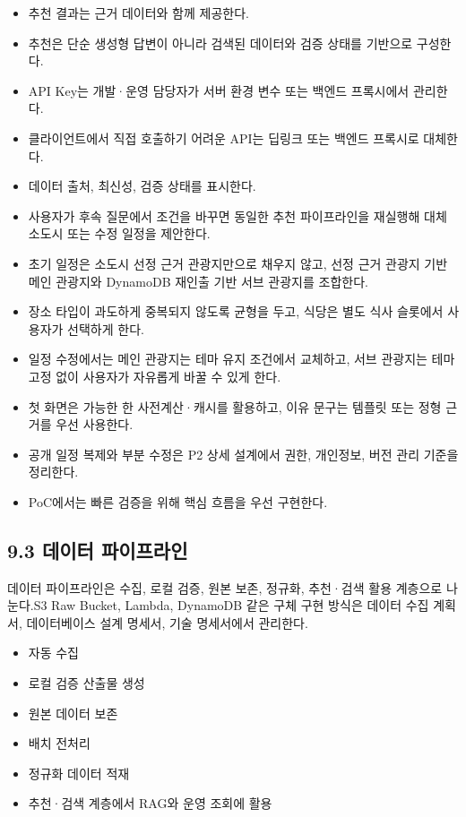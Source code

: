 \documentclass[12pt,a4paper]{article}
\newcommand{\DocNeedspace}[1]{\par\ifdim\dimexpr\pagegoal-\pagetotal\relax<#1\newpage\fi}
\begin{document}
\begin{itemize}
\item 추천 결과는 근거 데이터와 함께 제공한다.
\item 추천은 단순 생성형 답변이 아니라 검색된 데이터와 검증 상태를 기반으로 구성한다.
\item API Key는 개발·운영 담당자가 서버 환경 변수 또는 백엔드 프록시에서 관리한다.
\item 클라이언트에서 직접 호출하기 어려운 API는 딥링크 또는 백엔드 프록시로 대체한다.
\item 데이터 출처, 최신성, 검증 상태를 표시한다.
\item 사용자가 후속 질문에서 조건을 바꾸면 동일한 추천 파이프라인을 재실행해 대체 소도시 또는 수정 일정을 제안한다.
\item 초기 일정은 소도시 선정 근거 관광지만으로 채우지 않고, 선정 근거 관광지 기반 메인 관광지와 DynamoDB 재인출 기반 서브 관광지를 조합한다.
\item 장소 타입이 과도하게 중복되지 않도록 균형을 두고, 식당은 별도 식사 슬롯에서 사용자가 선택하게 한다.
\item 일정 수정에서는 메인 관광지는 테마 유지 조건에서 교체하고, 서브 관광지는 테마 고정 없이 사용자가 자유롭게 바꿀 수 있게 한다.
\item 첫 화면은 가능한 한 사전계산·캐시를 활용하고, 이유 문구는 템플릿 또는 정형 근거를 우선 사용한다.
\item 공개 일정 복제와 부분 수정은 P2 상세 설계에서 권한, 개인정보, 버전 관리 기준을 정리한다.
\item PoC에서는 빠른 검증을 위해 핵심 흐름을 우선 구현한다.
\end{itemize}


\DocNeedspace{24\baselineskip}
\subsection*{9.3 데이터 파이프라인}


\DocNeedspace{3\baselineskip}
데이터 파이프라인은 수집, 로컬 검증, 원본 보존, 정규화, 추천·검색 활용 계층으로 나눈다.\newline S3 Raw Bucket, Lambda, DynamoDB 같은 구체 구현 방식은 데이터 수집 계획서, 데이터베이스 설계 명세서, 기술 명세서에서 관리한다.


\begin{itemize}
\item 자동 수집
\item 로컬 검증 산출물 생성
\item 원본 데이터 보존
\item 배치 전처리
\item 정규화 데이터 적재
\item 추천·검색 계층에서 RAG와 운영 조회에 활용
\end{itemize}
\end{document}

